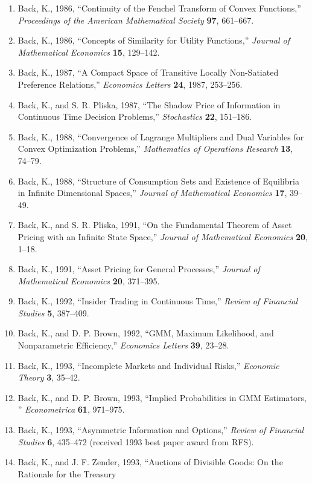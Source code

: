 \documentclass[11pt]{article}
\begin{document}
\begin{enumerate}
\item  Back, K., 1986, ``Continuity of the Fenchel Transform of Convex Functions,''
{\em Proceedings of the American Mathematical Society\/} {\bf 97},
661--667.
\item  Back, K., 1986,
``Concepts of Similarity for Utility Functions,'' {\em
Journal of Mathematical Economics\/} {\bf 15}, 129--142.
\item  Back, K., 1987, ``A Compact Space of Transitive Locally Non-Satiated
Preference Relations,'' {\em Economics Letters\/} {\bf 24}, 1987,
253--256.
\item  Back, K., and S. R. Pliska, 1987, ``The Shadow Price of Information in Continuous Time
Decision
Problems,'' {\em Stochastics\/} {\bf 22}, 151--186.
\item  Back, K., 1988, ``Convergence of Lagrange Multipliers and Dual Variables for
Convex Optimization Problems,'' {\em Mathematics of Operations
Research\/} {\bf 13}, 74--79.
\item  Back, K., 1988, ``Structure of Consumption Sets and Existence of Equilibria
in Infinite Dimensional Spaces,'' {\em Journal of Mathematical
Economics\/} {\bf 17}, 39--49.
\item  Back, K., and S. R. Pliska, 1991, ``On the Fundamental Theorem of Asset Pricing with an
Infinite
State Space,''
{\em Journal of Mathematical Economics\/} {\bf 20}, 1--18.
\item  Back, K., 1991, ``Asset Pricing for General Processes,'' {\em Journal of
Mathematical Economics\/} {\bf 20}, 371--395.
\item  Back, K., 1992, ``Insider Trading in Continuous Time,'' {\em Review of Financial
Studies\/} {\bf 5}, 387--409.
\item  Back, K., and D. P. Brown, 1992, ``GMM, Maximum Likelihood, and Nonparametric
Efficiency,'' {\em Economics Letters\/}
{\bf 39}, 23--28.
\item Back, K., 1993, ``Incomplete Markets and Individual Risks,''
{\em Economic Theory\/} {\bf 3}, 35--42.
\item  Back, K., and D. P. Brown, 1993, ``Implied Probabilities in GMM Estimators, ''
{\em Econometrica\/} {\bf 61}, 971--975.
\item Back, K., 1993, ``Asymmetric Information and Options,'' {\em Review of Financial
Studies} {\bf 6}, 435--472 (received 1993 best paper award from RFS).
\item Back, K., and J. F. Zender, 1993, ``Auctions of Divisible Goods: On the Rationale for the Treasury

\end{enumerate}
\end{document}
